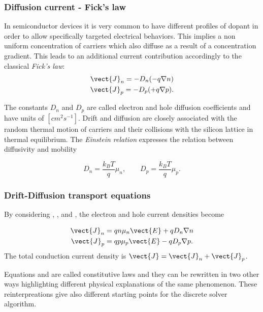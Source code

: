 \subsubsection{Diffusion current - Fick's law}

In semiconductor devices it is very common to have different profiles of dopant in order to allow specifically targeted electrical behaviors. This implies a non uniform concentration of carriers which also diffuse as a result of a concentration gradient. This leads to an additional current contribution accordingly to the classical \textit{Fick's law}:
\begin{align}
\vect{J}_n = -D_n(-q\nabla n) \label{eq: diff electron}\\
\vect{J}_p = -D_p(+q\nabla p) . \label{eq: diff hole}
\end{align}

The constants $D_n$ and $D_p$ are called electron and hole diffusion coefficients and have units of $[cm^2s^{-1}]$. Drift and diffusion are closely associated with the random thermal motion of carriers and their collisions with the silicon lattice in thermal equilibrium. The \textit{Einstein relation}  expresses the relation between diffusivity and mobility

\begin{equation}
\label{eq: einstein relation}
D_n = \dfrac{k_BT}{q}\mu_n, \qquad D_p = \dfrac{k_BT}{q}\mu_p.
\end{equation}

\subsubsection{Drift-Diffusion transport equations}
\label{subsub:driftdiffusion transport}

By considering , ,  and , the electron and hole current densities become \cite{selberherr:SimSem}

\begin{align}
\vect{J}_n &= qn\mu_n\vect{E} + qD_n\nabla n  \label{eq: drift diff electron}\\ 
\vect{J}_p &= qp\mu_p\vect{E} - qD_p \nabla p. \label{eq: drift diff hole}
\end{align}
The total conduction current density is $\vect{J}=\vect{J}_n+\vect{J}_p$.

Equations  and  are called constitutive laws and they can be rewritten in two other ways highlighting different physical explanations of the same phenomenon. These reinterpreations give also different starting points for the discrete solver algorithm.

